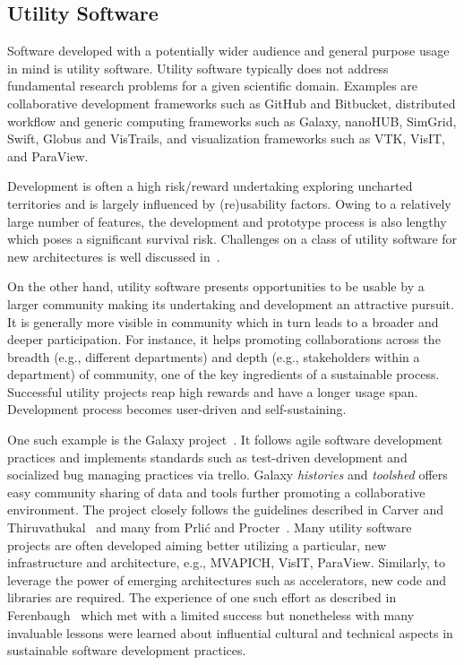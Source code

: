 \documentclass[11pt, oneside]{amsart}
\newcommand{\toolname}[1] {\textsf{#1}}
\begin{document}
\subsection{Utility Software}
Software developed with a potentially wider audience and general
purpose usage in mind is utility software. Utility software typically
does not address fundamental research problems for a given scientific
domain. Examples are collaborative development frameworks such as
\toolname{GitHub} and \toolname{Bitbucket}, distributed workflow and
generic computing frameworks such as \toolname{Galaxy},
\toolname{nanoHUB}, \toolname{SimGrid}, \toolname{Swift},
\toolname{Globus} and \toolname{VisTrails}, and visualization
frameworks such as \toolname{VTK}, \toolname{VisIT}, and \toolname{ParaView}.

Development is often a high risk/reward undertaking exploring
uncharted territories and is largely influenced by (re)usability
factors. Owing to a relatively large number of features, the development
and prototype process is also lengthy which poses a significant
survival risk. Challenges on a class of utility software for new
architectures is well discussed in~\cite{Ferenbaugh_WSSSPE}.

On the other hand, utility software presents opportunities to be usable by a
larger community making its undertaking and development an attractive pursuit.
It is generally more visible in community which in turn leads to a broader and
deeper participation. For instance, it helps promoting collaborations across
the breadth (e.g., different departments) and depth (e.g., stakeholders within
a department) of community, one of the key ingredients of a sustainable
process. Successful utility projects reap high rewards and have a longer usage
span. Development process becomes user-driven and self-sustaining.

One such example is the \toolname{Galaxy} project~\cite{Galaxy}. It
follows agile software development practices and implements standards
such as test-driven development and socialized bug managing practices
via \toolname{trello}. Galaxy \emph{histories} and \emph{toolshed}
offers easy community sharing of data and tools further promoting a
collaborative environment. The project closely follows the
guidelines described in Carver and Thiruvathukal~\cite{Carver_WSSSPE}
and many from Prli\'{c} and Procter~\cite{Prlic_WSSSPE}. Many utility
software projects are often developed aiming better utilizing a
particular, new infrastructure and architecture, e.g.,
\toolname{MVAPICH}, \toolname{VisIT}, \toolname{ParaView}. Similarly, to leverage the power
of emerging architectures such as accelerators, new code and libraries
are required. The experience of one such effort as described in
Ferenbaugh~\cite{Ferenbaugh_WSSSPE} which met with a limited success
but nonetheless with many invaluable lessons were learned about
influential cultural and technical aspects in sustainable software
development practices.
\end{document}
